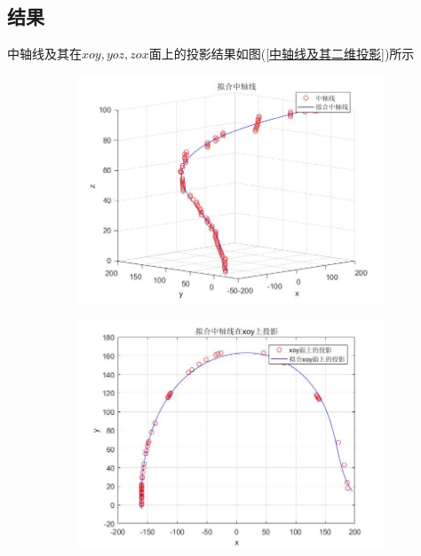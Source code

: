     \subsection{结果}
        \par
        中轴线及其在$xoy,yoz,zox$面上的投影结果如图(\ref{中轴线及其二维投影})所示
           \begin{figure}[H]
                \centering
                \begin{subfigure}[b]{0.4\textwidth}
                    \includegraphics[width=\textwidth]{images/zhongzhouxian.jpg}
                \end{subfigure}
                \begin{subfigure}[b]{0.4\textwidth}
                    \includegraphics[width=\textwidth]{images/zhongzhouxian_xoy.jpg}

\end{subfigure}
\end{figure}
